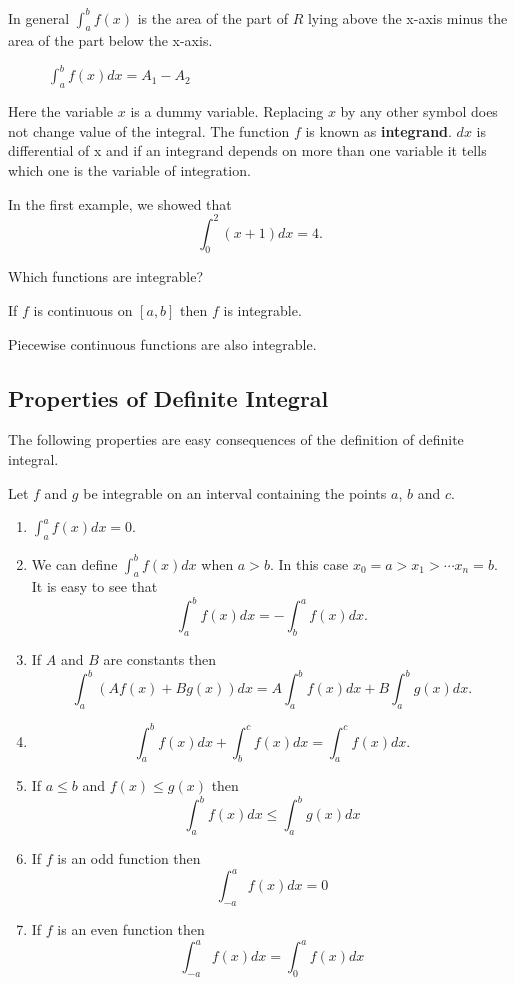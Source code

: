 \documentclass[../calc1-main.tex]{subfiles}
\begin{document}
In general $\int_a^b f(x)$ is the area of the part of $R$ lying above the x-axis minus the area of the part below the x-axis.

\begin{figure}[H]
  \centering
  
  \caption{ $\int_a^b f(x) dx = A_1 - A_2$}
\end{figure}

Here the variable $x$ is a dummy variable. Replacing $x$ by any other symbol does not change value of the integral. The function $f$ is known as \textbf{integrand}. $dx$ is differential of x and  if an integrand depends on more than one variable it tells which one is the variable of integration.

In the first example, we showed that
\[
  \int_0^2 (x+1) dx = 4.
\]

Which functions are integrable?
\begin{theorem}
  If $f$ is continuous on $[a, b]$ then $f$ is integrable.
\end{theorem}
Piecewise continuous functions are also integrable.

\subsection*{Properties of Definite Integral}
The following properties are easy consequences of the definition of definite integral.
\begin{theorem}
  Let $f$ and $g$ be integrable on an interval containing the points $a$, $b$ and $c$.
  \begin{enumerate}
    \item $\int_a^a f(x) dx = 0$.
    \item We can define $\int_a^b f(x) dx$ when $a>b$. In this case $x_0 = a > x_1 > \cdots x_n = b$. It is easy to see that
    \[
      \int_a^b f(x) dx = - \int_b^a f(x) dx.
    \]
    \item If $A$ and $B$ are constants then
    \[
      \int_a^b (A f(x) + B g(x)) dx =
      A \int_a^b f(x)dx + B \int_a^b g(x)dx.
    \]
    \item
    \[
      \int_a^b f(x) dx + \int_b^c f(x) dx =
      \int_a^c f(x) dx.
    \]
    \item If $a \le b$ and $f(x) \le g(x)$ then
    \[
      \int_a^b f(x) dx \le \int_a^b g(x) dx
    \]
    \item If $f$ is an odd function then
    \[
      \int_{-a}^a f(x) dx = 0
    \]
    \item If $f$ is an even function then
    \[
      \int_{-a}^a f(x) dx = \int_0^a f(x) dx
    \]
  \end{enumerate}
\end{theorem}
\end{document}
